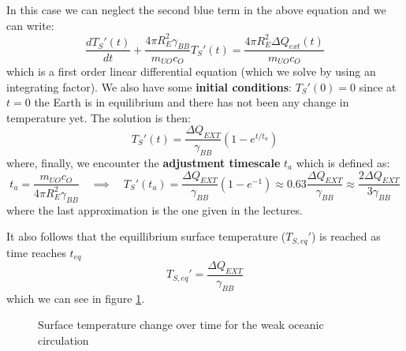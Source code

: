In this case we can neglect the second blue term in the above equation and we
can write:
$$
\frac{dT_S'(t)}{dt} + \frac{4\pi R_E^2 \gamma_{BB}}{m_{UO}c_O} T_S'(t) = 
\frac{4\pi R_E^2 \Delta Q_{ext}(t)}{m_{UO}c_O}
$$
which is a first order linear differential equation (which we solve by using an
integrating factor). We also have some \textbf{initial conditions}: $T_S'(0) = 0$
since at $t=0$ the Earth is in equilibrium and there has not been any change in
temperature yet. The solution is then:
$$
\boxed{
T_S'(t) = \frac{\Delta Q_{EXT}}{\gamma_{BB}} \left(1-e^{t/t_a}\right)
}
$$
where, finally, we encounter the \textbf{adjustment timescale} $t_a$ which is
defined as:
$$
t_a = \frac{m_{UO}c_O}{4\pi R_E^2 \gamma_{BB}} \quad \implies \quad T_S'(t_a) =
\frac{\Delta Q_{EXT}}{\gamma_{BB}} \left(1-e^{-1}\right) \approx 0.63 
\frac{\Delta Q_{EXT}}{\gamma_{BB}} \approx \frac{2 \Delta Q_{EXT}}{3\gamma_{BB}}
$$
where the last approximation is the one given in the lectures.

It also follows that the equillibrium surface temperature ($T_{S,eq}'$) is reached
as time reaches $t_{eq}$ 
$$
\boxed{T_{S,eq}' = \frac{\Delta Q_{EXT}}{\gamma_{BB}}}
$$
which we can see in figure \ref{fig:surface_temp_weak}.

\begin{figure}[h]
    \centering
    \caption{Surface temperature change over time for the weak oceanic circulation}
    \label{fig:surface_temp_weak}
\end{figure}

